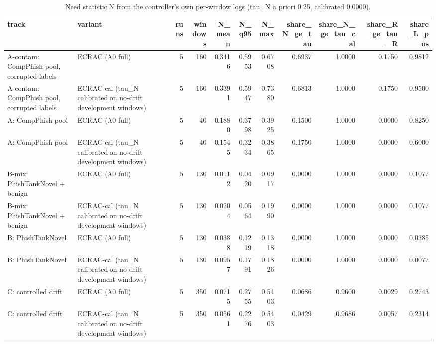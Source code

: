 \begin{table}[t]
\centering
\scriptsize
\caption{Need statistic N from the controller's own per-window logs (tau\_N a priori 0.25, calibrated 0.0000).}
\label{tab:rev_R12_ecrac_need_statistic_from_logs}
\begin{tabular}{llrrrrrrrrr}
\toprule
track & variant & runs & windows & N\_mean & N\_q95 & N\_max & share\_N\_ge\_tau & share\_N\_ge\_tau\_cal & share\_R\_ge\_tau\_R & share\_L\_pos \\
\midrule
A-contam: CompPhish pool, corrupted labels & ECRAC (A0 full) & 5 & 160 & 0.3416 & 0.5953 & 0.6708 & 0.6937 & 1.0000 & 0.1750 & 0.9812 \\
A-contam: CompPhish pool, corrupted labels & ECRAC-cal (tau\_N calibrated on no-drift development windows) & 5 & 160 & 0.3391 & 0.5947 & 0.7380 & 0.6813 & 1.0000 & 0.1750 & 0.9500 \\
A: CompPhish pool & ECRAC (A0 full) & 5 & 40 & 0.1880 & 0.3798 & 0.3925 & 0.1500 & 1.0000 & 0.0000 & 0.8250 \\
A: CompPhish pool & ECRAC-cal (tau\_N calibrated on no-drift development windows) & 5 & 40 & 0.1545 & 0.3234 & 0.3865 & 0.1750 & 1.0000 & 0.0000 & 0.6000 \\
B-mix: PhishTankNovel + benign & ECRAC (A0 full) & 5 & 130 & 0.0112 & 0.0420 & 0.0917 & 0.0000 & 1.0000 & 0.0000 & 0.1077 \\
B-mix: PhishTankNovel + benign & ECRAC-cal (tau\_N calibrated on no-drift development windows) & 5 & 130 & 0.0204 & 0.0564 & 0.1990 & 0.0000 & 1.0000 & 0.0000 & 0.1077 \\
B: PhishTankNovel & ECRAC (A0 full) & 5 & 130 & 0.0388 & 0.1219 & 0.1318 & 0.0000 & 1.0000 & 0.0000 & 0.0385 \\
B: PhishTankNovel & ECRAC-cal (tau\_N calibrated on no-drift development windows) & 5 & 130 & 0.0957 & 0.1791 & 0.1826 & 0.0000 & 1.0000 & 0.0000 & 0.0077 \\
C: controlled drift & ECRAC (A0 full) & 5 & 350 & 0.0715 & 0.2755 & 0.5403 & 0.0686 & 0.9600 & 0.0029 & 0.2743 \\
C: controlled drift & ECRAC-cal (tau\_N calibrated on no-drift development windows) & 5 & 350 & 0.0561 & 0.2276 & 0.5403 & 0.0429 & 0.9686 & 0.0057 & 0.2314 \\
\bottomrule
\end{tabular}
\end{table}